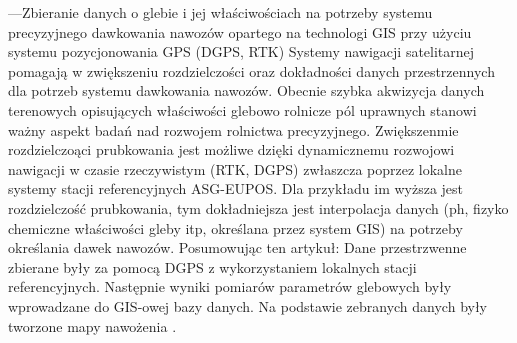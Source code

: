 ---Zbieranie danych o glebie i jej właściwościach na potrzeby systemu precyzyjnego dawkowania nawozów 
opartego na technologi GIS przy użyciu systemu pozycjonowania GPS (DGPS, RTK)
Systemy nawigacji satelitarnej pomagają w zwiększeniu rozdzielczości oraz dokładności danych przestrzennych
dla potrzeb systemu dawkowania nawozów. Obecnie szybka akwizycja danych terenowych opisujących właściwości glebowo rolnicze pól uprawnych
stanowi ważny aspekt badań nad rozwojem rolnictwa precyzyjnego. Zwiększenmie rozdzielczoąci prubkowania jest możliwe dzięki
dynamicznemu rozwojowi nawigacji w czasie rzeczywistym (RTK, DGPS) zwłaszcza poprzez lokalne systemy stacji referencyjnych ASG-EUPOS.
Dla przykładu im wyższa jest rozdzielczość prubkowania, tym dokładniejsza jest interpolacja danych 
(ph, fizyko chemiczne właściwości gleby itp, określana przez system GIS) na potrzeby określania dawek nawozów.
Posumowując ten artykuł: Dane przestrzwenne zbierane były za pomocą DGPS z wykorzystaniem lokalnych stacji referencyjnych.
Następnie wyniki pomiarów parametrów glebowych były wprowadzane do GIS-owej bazy danych. Na podstawie zebranych danych były tworzone mapy nawożenia \cite{CCTA5_268_278}.

